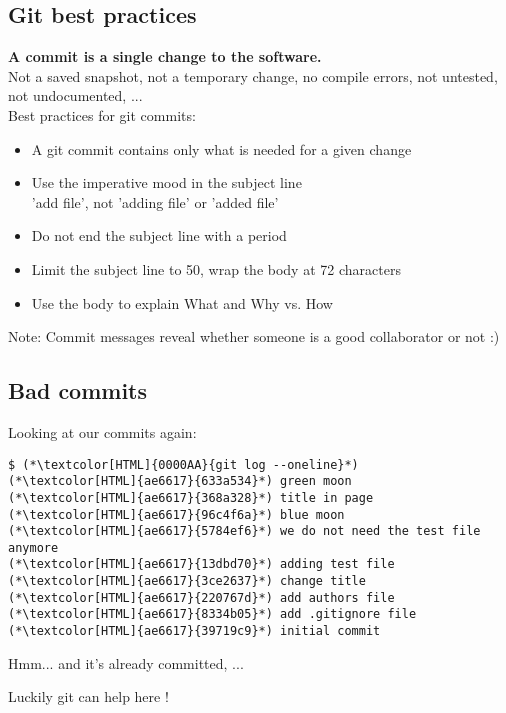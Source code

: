 \subsection{Git best practices}
\begin{frame}[fragile]
  \subslidetitle
  \textbf{A commit is a single change to the software.}\pause{} \\
  \vspace{1em}
  Not a saved snapshot,\pause{} not a temporary change,\pause{} no compile errors,\pause{} not
  untested,\pause{} not undocumented, ...\pause
  \\
  \vspace{1em}
  Best practices for git commits:
  \begin{itemize}
    \pause
    \item A git commit contains only what is needed for a given change
    \pause
    \item Use the imperative mood in the subject line \\
      'add file', not 'adding file' or 'added file'
    \pause
    \item Do not end the subject line with a period
    \pause
    \item Limit the subject line to 50, wrap the body at 72 characters
    \pause
    \item Use the body to explain What and Why vs. How
  \end{itemize}
  \pause
  \vspace{1em}
  Note: Commit messages reveal whether someone is a good collaborator or not :)
\end{frame}

\subsection{Bad commits}
\begin{frame}[fragile]
  \subslidetitle

  Looking at our commits again:
  \begin{lstlisting}
$ (*\textcolor[HTML]{0000AA}{git log --oneline}*)
(*\textcolor[HTML]{ae6617}{633a534}*) green moon
(*\textcolor[HTML]{ae6617}{368a328}*) title in page
(*\textcolor[HTML]{ae6617}{96c4f6a}*) blue moon
(*\textcolor[HTML]{ae6617}{5784ef6}*) we do not need the test file anymore
(*\textcolor[HTML]{ae6617}{13dbd70}*) adding test file
(*\textcolor[HTML]{ae6617}{3ce2637}*) change title
(*\textcolor[HTML]{ae6617}{220767d}*) add authors file
(*\textcolor[HTML]{ae6617}{8334b05}*) add .gitignore file
(*\textcolor[HTML]{ae6617}{39719c9}*) initial commit
\end{lstlisting}

  Hmm... and it's already committed, ...

  \vspace{1em}
  Luckily git can help here !
\end{frame}

